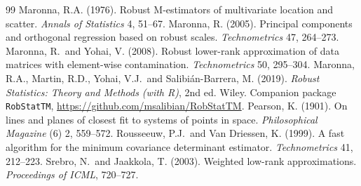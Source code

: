 \documentclass[11pt]{article}
\theoremstyle{definition}
\theoremstyle{remark}
\begin{document}
\begin{thebibliography}{99}
Maronna, R.A. (1976). Robust M-estimators of multivariate location and scatter. \emph{Annals of Statistics} 4, 51--67.
Maronna, R. (2005). Principal components and orthogonal regression based on robust scales. \emph{Technometrics} 47, 264--273.
Maronna, R.\ and Yohai, V. (2008). Robust lower-rank approximation of data matrices with element-wise contamination.
\emph{Technometrics} 50, 295--304.
Maronna, R.A., Martin, R.D., Yohai, V.J.\ and Salibi\'an-Barrera, M. (2019). \emph{Robust Statistics: Theory and Methods
(with R)}, 2nd ed. Wiley. Companion package \texttt{RobStatTM}, \url{https://github.com/msalibian/RobStatTM}.
Pearson, K. (1901). On lines and planes of closest fit to systems of points in space.
\emph{Philosophical Magazine} (6) 2, 559--572.
Rousseeuw, P.J.\ and Van Driessen, K. (1999). A fast algorithm for the minimum covariance determinant estimator.
\emph{Technometrics} 41, 212--223.
Srebro, N.\ and Jaakkola, T. (2003). Weighted low-rank approximations. \emph{Proceedings of ICML}, 720--727.
\end{thebibliography}
\end{document}
